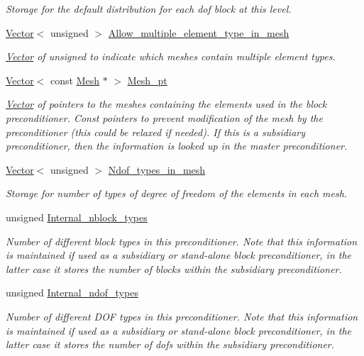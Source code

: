 \begin{DoxyCompactItemize}
\begin{DoxyCompactList}\small\item\em Storage for the default distribution for each dof block at this level. \end{DoxyCompactList}\item 
\hyperlink{classoomph_1_1Vector}{Vector}$<$ unsigned $>$ \hyperlink{classoomph_1_1BlockPreconditioner_a2f3a3ac8c192a83facd5b560f017413e}{Allow\+\_\+multiple\+\_\+element\+\_\+type\+\_\+in\+\_\+mesh}
\begin{DoxyCompactList}\small\item\em \hyperlink{classoomph_1_1Vector}{Vector} of unsigned to indicate which meshes contain multiple element types. \end{DoxyCompactList}\item 
\hyperlink{classoomph_1_1Vector}{Vector}$<$ const \hyperlink{classoomph_1_1Mesh}{Mesh} $\ast$ $>$ \hyperlink{classoomph_1_1BlockPreconditioner_a89adb506e8f9103c80b4b36cc309f536}{Mesh\+\_\+pt}
\begin{DoxyCompactList}\small\item\em \hyperlink{classoomph_1_1Vector}{Vector} of pointers to the meshes containing the elements used in the block preconditioner. Const pointers to prevent modification of the mesh by the preconditioner (this could be relaxed if needed). If this is a subsidiary preconditioner, then the information is looked up in the master preconditioner. \end{DoxyCompactList}\item 
\hyperlink{classoomph_1_1Vector}{Vector}$<$ unsigned $>$ \hyperlink{classoomph_1_1BlockPreconditioner_a43e9d73ff61daa00aea4e4deff0d6aff}{Ndof\+\_\+types\+\_\+in\+\_\+mesh}
\begin{DoxyCompactList}\small\item\em Storage for number of types of degree of freedom of the elements in each mesh. \end{DoxyCompactList}\item 
unsigned \hyperlink{classoomph_1_1BlockPreconditioner_a06c7426a2c8c096c8f4dc583444e0e0e}{Internal\+\_\+nblock\+\_\+types}
\begin{DoxyCompactList}\small\item\em Number of different block types in this preconditioner. Note that this information is maintained if used as a subsidiary or stand-\/alone block preconditioner, in the latter case it stores the number of blocks within the subsidiary preconditioner. \end{DoxyCompactList}\item 
unsigned \hyperlink{classoomph_1_1BlockPreconditioner_a3985436e4645c202eadd47a4f4f466e2}{Internal\+\_\+ndof\+\_\+types}
\begin{DoxyCompactList}\small\item\em Number of different D\+OF types in this preconditioner. Note that this information is maintained if used as a subsidiary or stand-\/alone block preconditioner, in the latter case it stores the number of dofs within the subsidiary preconditioner. \end{DoxyCompactList}\end{DoxyCompactItemize}
